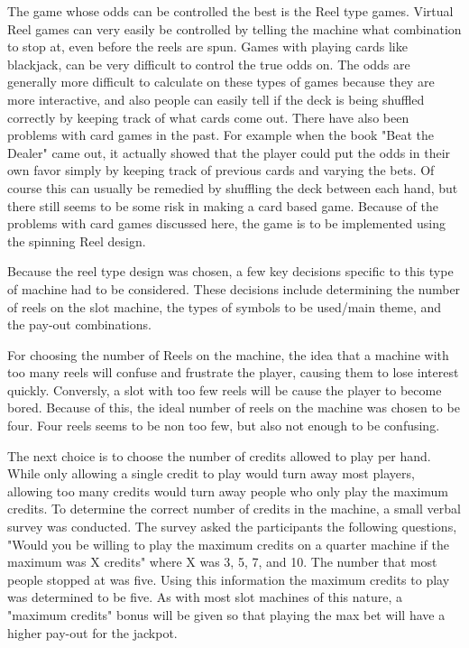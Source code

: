   The game whose odds can be controlled the best is the Reel type games.  Virtual Reel games can very easily be controlled by telling the machine what combination to stop at, even before the reels are spun.  Games with playing cards like blackjack, can be very difficult to control the true odds on.  The odds are generally more difficult to calculate on these types of games because they are more interactive, and also people can easily tell if the deck is being shuffled correctly by keeping track of what cards come out.  There have also been problems with card games in the past.  For example when the book "Beat the Dealer" came out, it actually showed that the player could put the odds in their own favor simply by keeping track of previous cards and varying the bets.  Of course this can usually be remedied by shuffling the deck between each hand, but there still seems to be some risk in making a card based game.  Because of the problems with card games discussed here, the game is to be implemented using the spinning Reel design.


Because the reel type design was chosen, a few key decisions specific to this type of machine had to be considered. These decisions include determining the number of reels on the slot machine, the types of symbols to be used/main theme, and the pay-out combinations.

For choosing the number of Reels on the machine, the idea that a machine with too many reels will confuse and frustrate the player, causing them to lose interest quickly. Conversly, a slot with too few reels will be cause the player to become bored.  Because of this, the ideal number of reels on the machine was chosen to be four.  Four reels seems to be non too few, but also not enough to be confusing.

The next choice is to choose the number of credits allowed to play per hand.  While only allowing a single credit to play would turn away most players, allowing too many credits would turn away people who only play the maximum credits.  To determine the correct number of credits in the machine, a small verbal survey was conducted.  The survey asked the participants the following questions, "Would you be willing to play the maximum credits on a quarter machine if the maximum was X credits" where X was 3, 5, 7, and 10.  The number that most people stopped at was five.  Using this information the maximum credits to play was determined to be five.  As with most slot machines of this nature, a "maximum credits" bonus will be given so that playing the max bet will have a higher pay-out for the jackpot.

